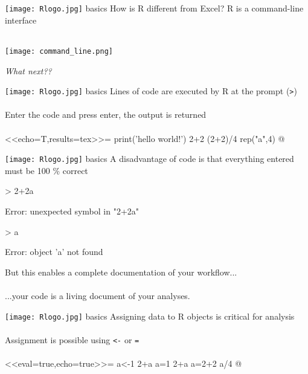 \documentclass[xcolor=svgnames]{beamer}
\begin{document}
\begin{frame}[t]{\texttt{[image: Rlogo.jpg]} \hspace{0.01in} basics}
How is R different from Excel?  R is a command-line interface\\~\\
\centerline{\texttt{[image: command\_line.png]}}
\centerline{\emph{What next??}}
\end{frame}

\begin{frame}[fragile]{\texttt{[image: Rlogo.jpg]} \hspace{0.01in} basics}
Lines of code are executed by R at the prompt (\textit{\texttt{>}})\\~\\
Enter the code and press enter, the output is returned\\~\\
<<echo=T,results=tex>>=
print('hello world!')
2+2
(2+2)/4
rep("a",4)
@

\end{frame}

\begin{frame}[fragile]{\texttt{[image: Rlogo.jpg]} \hspace{0.01in} basics}
A disadvantage of code is that everything entered must be 100 \% correct
\begin{Schunk}
\begin{Sinput}
> 2+2a
\end{Sinput}
\begin{Soutput}
Error: unexpected symbol in "2+2a"
\end{Soutput}
\begin{Sinput}
> a
\end{Sinput}
\begin{Soutput}
Error: object 'a' not found
\end{Soutput}
\end{Schunk}
\vspace{0.2in}
But this enables a complete documentation of your workflow... \\~\\
...your code is a living document of your analyses.
\end{frame}

\begin{frame}[t,fragile]{\texttt{[image: Rlogo.jpg]} \hspace{0.01in} basics}
Assigning data to R objects is critical for analysis\\~\\
Assignment is possible using \textit{\texttt{<-}} or \textit{\texttt{=}}\\~\\
<<eval=true,echo=true>>=
a<-1
2+a
a=1
2+a
a=2+2
a/4
@
\end{frame}
\end{document}
